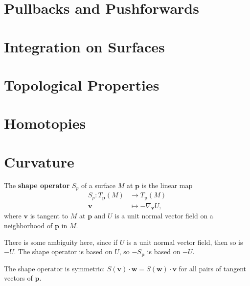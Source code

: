 \documentclass[twoside,10pt]{report}
\begin{document}

\section{Pullbacks and Pushforwards}


\section{Integration on Surfaces}



\section{Topological Properties}


\section{Homotopies}



\section{Curvature}

\begin{defn}[]
The \textbf{shape operator} $S_p$ of a surface $M$ at $\mathbf{p}$ is the linear map
\begin{align*}
	S_p: T_{\mathbf{p}}(M)&\to T_{\mathbf{p}}(M)\\
	\mathbf{v} &\mapsto  -\nabla_{\mathbf{v}}U,
\end{align*}
where $\mathbf{v}$ is tangent to $M$ at $\mathbf{p}$ and $U$ is a unit normal vector field on a neighborhood of $\mathbf{p}$ in $M$.
\end{defn}

There is some ambiguity here, since if $U$ is a unit normal vector field, then so is $-U$. The shape operator is based on $U$, so $-S_{\mathbf{p}}$ is based on $-U$.

The shape operator is symmetric: $S(\mathbf{v}) \cdot \mathbf{w} = S(\mathbf{w})\cdot \mathbf{v}$ for all pairs of tangent vectors of $\mathbf{p}$.
\end{document}

